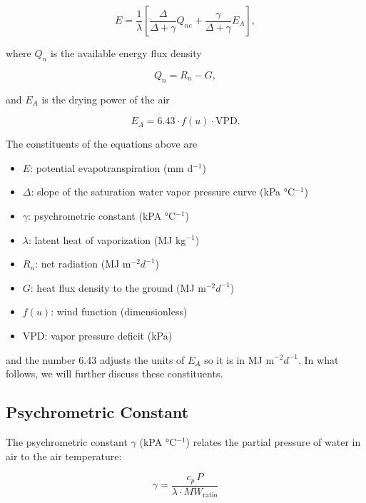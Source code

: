 \documentclass[
  letterpaper,
  DIV=11,
  numbers=noendperiod]{scrreprt}
\providecommand{\tightlist}{%
  \setlength{\itemsep}{0pt}\setlength{\parskip}{0pt}}\usepackage{longtable,booktabs,array}
\begin{document}
\[
\begin{equation}
E = \frac{1}{\lambda}\left[ \frac{\Delta}{\Delta+\gamma}Q_{ne}+ \frac{\gamma}{\Delta+\gamma}E_A \right],
\end{equation}
\]

where \(Q_n\) is the available energy flux density

\[
\begin{equation}
Q_n = R_n - G,
\end{equation}
\]

and \(E_A\) is the drying power of the air

\[
\begin{equation}
E_A = 6.43\cdot f(u)\cdot\text{VPD}.
\end{equation}
\]

The constituents of the equations above are

\begin{itemize}
\tightlist
\item
  \(E\): potential evapotranspiration (mm d\(^{-1}\))
\item
  \(\Delta\): slope of the saturation water vapor pressure curve (kPa
  °C\(^{-1}\))
\item
  \(\gamma\): psychrometric constant (kPA °C\(^{-1}\))
\item
  \(\lambda\): latent heat of vaporization (MJ kg\(^{-1}\))
\item
  \(R_n\): net radiation (MJ m\(^{-2} d^{-1}\))
\item
  \(G\): heat flux density to the ground (MJ m\(^{-2} d^{-1}\))
\item
  \(f(u)\): wind function (dimensionless)
\item
  VPD: vapor pressure deficit (kPa)
\end{itemize}

and the number 6.43 adjusts the units of \(E_A\) so it is in MJ
m\(^{-2} d^{-1}\). In what follows, we will further discuss these
constituents.

\hypertarget{psychrometric-constant}{%
\subsection{Psychrometric Constant}\label{psychrometric-constant}}

The psychrometric constant \(\gamma\) (kPA °C\(^{-1}\)) relates the
partial pressure of water in air to the air temperature:

\[
  \begin{equation}
    \gamma = \frac{c_p\, P}{\lambda\cdot MW_\text{ratio}}
  \end{equation}
\]
\end{document}
